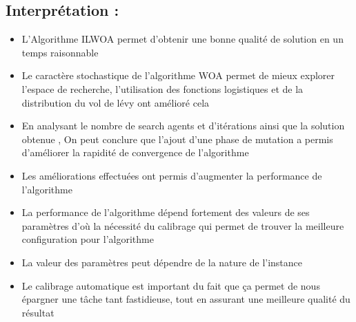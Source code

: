 \documentclass[12pt]{article}
\begin{document}
  \subsection{Interprétation :}
  \begin{itemize}
    \item L’Algorithme ILWOA permet d’obtenir une bonne qualité de solution en un temps raisonnable   
    \item Le caractère stochastique de l’algorithme WOA permet de mieux explorer l’espace de recherche, l’utilisation des fonctions logistiques et de la distribution du vol de lévy ont amélioré cela 
    \item En analysant le nombre de search agents et d’itérations ainsi que la solution obtenue , On peut conclure que l’ajout d’une phase de mutation a permis d’améliorer la rapidité de convergence de l’algorithme 
    \item Les améliorations effectuées ont permis d’augmenter la performance de l’algorithme 
    \item La performance de l’algorithme dépend fortement des valeurs de ses paramètres d’où la nécessité du calibrage qui permet de trouver la meilleure configuration pour l’algorithme
    \item La valeur des paramètres peut dépendre de la nature de l’instance
    \item Le calibrage automatique est important du fait que ça permet de nous épargner une tâche tant  fastidieuse, tout en assurant une meilleure qualité du résultat

\end{itemize}
\end{document}
